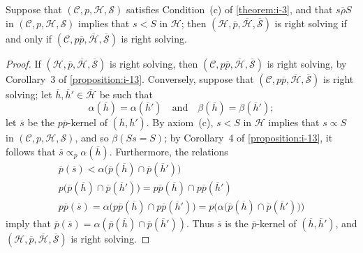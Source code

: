 \documentclass[a4paper,fleqn]{article}
\theoremstyle{plain}
\newenvironment{proposition}[1]
  {\renewcommand\theinnerproposition{#1}\innerproposition}
  {\endinnerproposition}
\theoremstyle{definition}
\newcommand{\textand}{\quad\text{and}\quad}
\newcommand{\CC}{\mathcal{C}}
\newcommand{\HH}{\mathcal{H}}
\newcommand{\bHH}{\overline{\HH}}
\renewcommand{\SS}{\mathcal{S}}
\newcommand{\bSS}{\overline{\SS}}
\newcommand{\relrhobar}{\mathrel{\overline{\rho}}}
\newcommand{\subs}{\mathrel{\propto}}
\begin{document}
\begin{proposition}{14}
\label{proposition:i-14}
  Suppose that $(\CC,p,\HH,\SS)$ satisfies Condition~(c) of \cref{theorem:i-3}, and that $s\relrhobar S$ in $(\CC,p,\HH,\SS)$ implies that $s<S$ in $\HH$;
  then $(\HH,\overline{p},\bHH,\bSS)$ is right solving if and only if $(\CC,p\overline{p},\bHH,\bSS)$ is right solving.
\end{proposition}

\begin{proof}
  If $(\HH,\overline{p},\bHH,\bSS)$ is right solving, then $(\CC,p\overline{p},\bHH,\bSS)$ is right solving, by Corollary~3 of \cref{proposition:i-13}.
  Conversely, suppose that $(\CC,p\overline{p},\bHH,\bSS)$ is right solving;
  let $\overline{h},\overline{h}'\in\bHH$ be such that
  \[
    \alpha(\overline{h})=\alpha(\overline{h}')
    \textand
    \beta(\overline{h})=\beta(\overline{h}');
  \]
  let $\overline{s}$ be the $p\overline{p}$-kernel of $(\overline{h},\overline{h}')$.
  By axiom~(c), $s<S$ in $\HH$ implies that $s\subs S$ in $(\CC,p,\HH,\SS)$, and so $\beta(Ss=S)$;
  by Corollary~4 of \cref{proposition:i-13}, it follows that $\overline{s}\subs_{\overline{p}}\alpha(\overline{h})$.
  Furthermore, the relations
  \[
    \begin{gathered}
      \overline{p}(\overline{s})
      < \alpha\big(
        \overline{p}(\overline{h})\cap\overline{p}(\overline{h}')
      \big)
    \\p\big(
        \overline{p}(\overline{h})\cap\overline{p}(\overline{h}')
      \big)
      = p\overline{p}(\overline{h})\cap p\overline{p}(\overline{h}')
    \\p\overline{p}(\overline{s})
      = \alpha\big(
        p\overline{p}(\overline{h})\cap p\overline{p}(\overline{h}')
      \big)
      = p\big(
        \alpha\big(
          \overline{p}(\overline{h})\cap\overline{p}(\overline{h}')
        \big)
      \big)
    \end{gathered}
  \]
  imply that $\overline{p}(\overline{s})=\alpha(\overline{p}(\overline{h})\cap\overline{p}(\overline{h}'))$.
  Thus $\overline{s}$ is the $\overline{p}$-kernel of $(\overline{h},\overline{h}')$, and $(\HH,\overline{p},\bHH,\bSS)$ is right solving.
\end{proof}
\end{document}
